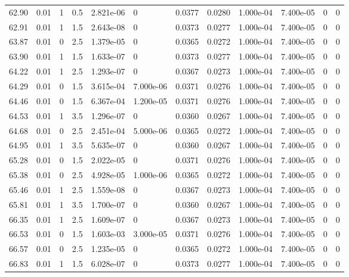 \documentclass[preview]{standalone}
\begin{document}
{{{{{{{\begin{tabular}{L{1.2cm}C{1.2cm} C{0.3cm}C{0.5cm} C{1.4cm}C{1.4cm} C{1.4cm}C{1.4cm} C{1.6cm}C{1.6cm} C{1.6cm}C{1.6cm}}
  62.90  &  0.01  & 1     & 0.5 &  2.821e-06  & 0  &  0.0377&   0.0280& 1.000e-04 & 7.400e-05   &  0 & 0  \\ 
  62.91  &  0.01  & 1     & 1.5 &  2.643e-08  & 0  &  0.0373&   0.0277& 1.000e-04 & 7.400e-05   &  0 & 0  \\ 
  63.87  &  0.01  & 0     & 2.5 &  1.379e-05  & 0  &  0.0365&   0.0272& 1.000e-04 & 7.400e-05   &  0 & 0  \\ 
  63.90  &  0.01  & 1     & 1.5 &  1.633e-07  & 0  &  0.0373&   0.0277& 1.000e-04 & 7.400e-05   &  0 & 0  \\ 
  64.22  &  0.01  & 1     & 2.5 &  1.293e-07  & 0  &  0.0367&   0.0273& 1.000e-04 & 7.400e-05   &  0 & 0  \\ 
  64.29  &  0.01  & 0     & 1.5 &  3.615e-04  & 7.000e-06  &  0.0371&   0.0276& 1.000e-04 & 7.400e-05   &  0 & 0  \\ 
  64.46  &  0.01  & 0     & 1.5 &  6.367e-04  & 1.200e-05  &  0.0371&   0.0276& 1.000e-04 & 7.400e-05   &  0 & 0  \\ 
  64.53  &  0.01  & 1     & 3.5 &  1.296e-07  & 0  &  0.0360&   0.0267& 1.000e-04 & 7.400e-05   &  0 & 0  \\ 
  64.68  &  0.01  & 0     & 2.5 &  2.451e-04  & 5.000e-06  &  0.0365&   0.0272& 1.000e-04 & 7.400e-05   &  0 & 0  \\ 
  64.95  &  0.01  & 1     & 3.5 &  5.635e-07  & 0  &  0.0360&   0.0267& 1.000e-04 & 7.400e-05   &  0 & 0  \\ 
  65.28  &  0.01  & 0     & 1.5 &  2.022e-05  & 0  &  0.0371&   0.0276& 1.000e-04 & 7.400e-05   &  0 & 0  \\ 
  65.38  &  0.01  & 0     & 2.5 &  4.928e-05  & 1.000e-06  &  0.0365&   0.0272& 1.000e-04 & 7.400e-05   &  0 & 0  \\ 
  65.46  &  0.01  & 1     & 2.5 &  1.559e-08  & 0  &  0.0367&   0.0273& 1.000e-04 & 7.400e-05   &  0 & 0  \\ 
  65.81  &  0.01  & 1     & 3.5 &  1.700e-07  & 0  &  0.0360&   0.0267& 1.000e-04 & 7.400e-05   &  0 & 0  \\ 
  66.35  &  0.01  & 1     & 2.5 &  1.609e-07  & 0  &  0.0367&   0.0273& 1.000e-04 & 7.400e-05   &  0 & 0  \\ 
  66.53  &  0.01  & 0     & 1.5 &  1.603e-03  & 3.000e-05  &  0.0371&   0.0276& 1.000e-04 & 7.400e-05   &  0 & 0  \\ 
  66.57  &  0.01  & 0     & 2.5 &  1.235e-05  & 0  &  0.0365&   0.0272& 1.000e-04 & 7.400e-05   &  0 & 0  \\ 
  66.83  &  0.01  & 1     & 1.5 &  6.028e-07  & 0  &  0.0373&   0.0277& 1.000e-04 & 7.400e-05   &  0 & 0  \\ 

\end{tabular}}}}}}}}
\end{document}
